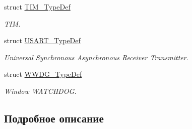 \begin{DoxyCompactItemize}
struct \mbox{\hyperlink{struct_t_i_m___type_def}{T\+I\+M\+\_\+\+Type\+Def}}
\begin{DoxyCompactList}\small\item\em T\+IM. \end{DoxyCompactList}\item 
struct \mbox{\hyperlink{struct_u_s_a_r_t___type_def}{U\+S\+A\+R\+T\+\_\+\+Type\+Def}}
\begin{DoxyCompactList}\small\item\em Universal Synchronous Asynchronous Receiver Transmitter. \end{DoxyCompactList}\item 
struct \mbox{\hyperlink{struct_w_w_d_g___type_def}{W\+W\+D\+G\+\_\+\+Type\+Def}}
\begin{DoxyCompactList}\small\item\em Window W\+A\+T\+C\+H\+D\+OG. \end{DoxyCompactList}\end{DoxyCompactItemize}


\subsection{Подробное описание}
